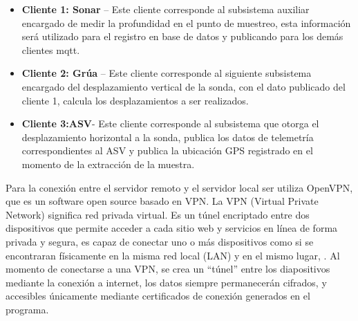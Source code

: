 \begin{itemize}
    \item \textbf{Cliente 1: Sonar} – Este cliente corresponde al subsistema auxiliar encargado de medir la profundidad en el punto de muestreo,  esta informaci\'on ser\'a utilizado para el registro en base de datos y publicando para los dem\'as clientes mqtt.
    \item \textbf{Cliente 2: Gr\'ua} – Este cliente corresponde al siguiente subsistema encargado del desplazamiento vertical de la sonda, con el dato publicado del cliente 1, calcula los desplazamientos a ser realizados.
    \item \textbf{Cliente 3:ASV}- Este cliente corresponde al subsistema que otorga el desplazamiento horizontal a la sonda, publica los datos de telemetr\'ia correspondientes al ASV y publica la ubicaci\'on GPS registrado en el momento de la extracci\'on de la muestra.
\end{itemize}

Para la conexi\'on entre el servidor remoto y el servidor local ser utiliza OpenVPN, que es un software open source basado en VPN. La VPN (Virtual Private Network) significa red privada virtual. Es un t\'unel encriptado entre dos dispositivos que permite acceder a cada sitio web y servicios en línea de forma privada y segura, es capaz de conectar uno o más dispositivos como si se encontraran físicamente en la misma red local (LAN) y en el mismo lugar, \cite{arora_131_nodate}. Al momento de conectarse a una VPN, se crea un “túnel” entre los diapositivos mediante la conexi\'on a internet, los datos siempre permanecerán cifrados, y accesibles \'unicamente mediante certificados de conexi\'on generados en el programa. 

